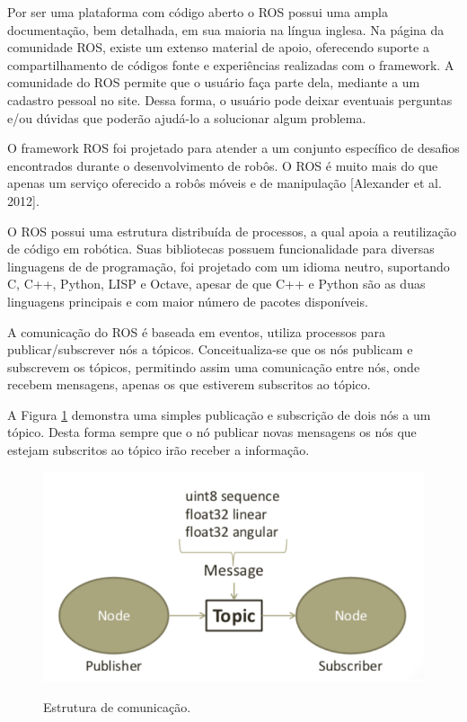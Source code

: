 Por ser uma plataforma com código aberto o ROS possui uma ampla documentação, bem detalhada, em sua maioria na língua inglesa. Na página da comunidade ROS, existe um extenso material de apoio, oferecendo suporte a compartilhamento de códigos fonte e experiências realizadas com o framework. A comunidade do ROS permite que o usuário faça parte dela, mediante a um cadastro pessoal no site. Dessa forma, o usuário pode deixar eventuais perguntas e/ou dúvidas que poderão ajudá-lo a solucionar algum problema.

O framework ROS foi projetado para atender a um conjunto específico de desafios encontrados durante o desenvolvimento de robôs. O ROS é muito mais do que apenas um serviço oferecido a robôs móveis e de manipulação [Alexander et al. 2012].

O ROS possui uma estrutura distribuída de processos, a qual apoia a reutilização de código em robótica. Suas bibliotecas possuem funcionalidade para diversas linguagens de de programação, foi projetado com um idioma neutro, suportando C, C++, Python, LISP e Octave, apesar de que C++ e Python são as duas linguagens principais e com maior número de pacotes disponíveis.

A comunicação do ROS é baseada em eventos, utiliza processos para publicar/subscrever nós a tópicos. Conceitualiza-se que os nós publicam e subscrevem os tópicos, permitindo assim uma comunicação entre nós, onde recebem mensagens, apenas os que estiverem subscritos ao tópico.

A Figura \ref{fig:estrutura_comunicacao_ros} demonstra uma simples publicação e subscrição de dois nós a um tópico. Desta forma sempre que o nó publicar novas mensagens os nós que estejam subscritos ao tópico irão receber a informação.

\begin{figure}[H]
	\centering
	\caption{Estrutura de comunicação.}
	\includegraphics[width=1\textwidth]
	{Figures/estrutura_comunicacao_ros}
	\label{fig:estrutura_comunicacao_ros}
\end{figure}


